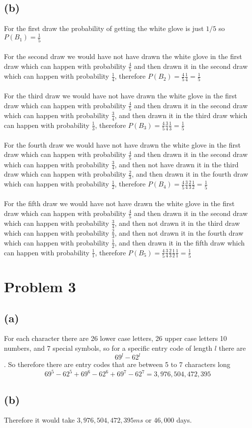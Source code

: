 \subsection*{(b)}
For the first draw the probability of getting the white glove is
just $1/5$ so $P(B_1)=\frac{1}{5}$\\\\
For the second draw we would have not have drawn the white glove in the
first draw which can happen with probability $\frac{4}{5}$ and 
then drawn it in the second draw which can happen with probability $\frac{1}{4}$,
therefore $P(B_2)=\frac{4}{5}\frac{1}{4}=\boxed{\frac{1}{5}}$\\\\
For the third draw we would have not have drawn the white glove in the
first draw which can happen with probability $\frac{4}{5}$ and 
then drawn it in the second draw which can happen with probability $\frac{3}{4}$,
and then drawn it in the third draw which can happen with probability $\frac{1}{3}$,
therefore $P(B_3)=\frac{4}{5}\frac{3}{4}\frac{1}{3}=\boxed{\frac{1}{5}}$\\\\
For the fourth draw we would have not have drawn the white glove in the
first draw which can happen with probability $\frac{4}{5}$ and 
then drawn it in the second draw which can happen with probability $\frac{3}{4}$,
and then not have drawn it in the third draw which can happen with probability $\frac{2}{3}$,
and then drawn it in the fourth draw which can happen with probability $\frac{1}{2}$,
therefore $P(B_4)=\frac{4}{5}\frac{3}{4}\frac{2}{3}\frac{1}{2}=\boxed{\frac{1}{5}}$\\\\
For the fifth draw we would have not have drawn the white glove in the
first draw which can happen with probability $\frac{4}{5}$ and 
then drawn it in the second draw which can happen with probability $\frac{3}{4}$,
and then not drawn it in the third draw which can happen with probability $\frac{2}{3}$,
and then not drawn it in the fourth draw which can happen with probability $\frac{1}{2}$,
and then drawn it in the fifth draw which can happen with probability $\frac{1}{1}$,
therefore $P(B_5)=\frac{4}{5}\frac{3}{4}\frac{2}{3}\frac{1}{2}\frac{1}{1}=\boxed{\frac{1}{5}}$
\section*{Problem 3}
\subsection*{(a)}
For each character there are 26 lower case letters, 26 upper case letters
10 numbers, and 7 special symbols, so
for a specific entry code of length $l$ there are 
$$69^l-62^l$$. 
So therefore there are entry codes that are between 5 to 7 characters long
$$69^5-62^5+69^6-62^6+69^7-62^7=\boxed{3,976,504,472,395}$$
\subsection*{(b)}
Therefore it would take  $3,976,504,472,395ms$ or $46,000$ days.

